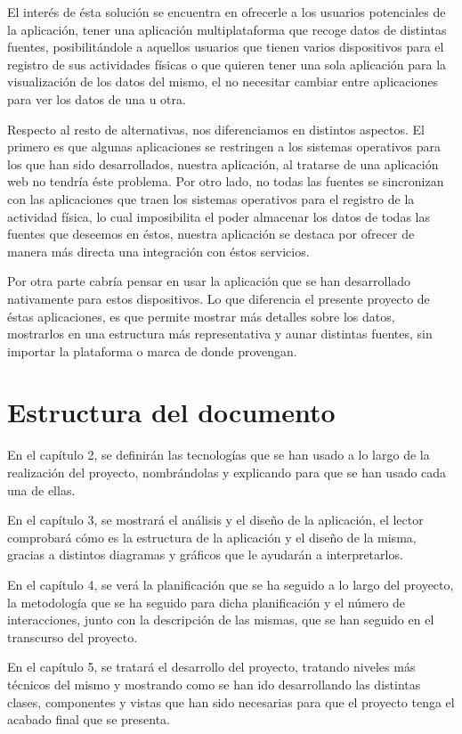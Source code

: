 \documentclass[11pt,openany]{book}
\begin{document}
El interés de ésta solución se encuentra en ofrecerle a los usuarios potenciales de la aplicación, tener una aplicación multiplataforma que recoge datos de distintas fuentes, posibilitándole a aquellos usuarios que tienen varios dispositivos para el registro de sus actividades físicas o que quieren tener una sola aplicación para la visualización de los datos del mismo, el no necesitar cambiar entre aplicaciones para ver los datos de una u otra.

Respecto al resto de alternativas, nos diferenciamos en distintos aspectos. El primero es que algunas aplicaciones se restringen a los sistemas operativos para los que han sido desarrollados, nuestra aplicación, al tratarse de una aplicación web no tendría éste problema. Por otro lado, no todas las fuentes se sincronizan con las aplicaciones que traen los sistemas operativos para el registro de la actividad física, lo cual imposibilita el poder almacenar los datos de todas las fuentes que deseemos en éstos, nuestra aplicación se destaca por ofrecer de manera más directa una integración con éstos servicios. 

Por otra parte cabría pensar en usar la aplicación que se han desarrollado nativamente para estos dispositivos. Lo que diferencia el presente proyecto de éstas aplicaciones, es que permite mostrar más detalles sobre los datos, mostrarlos en una estructura más representativa y aunar distintas fuentes, sin importar la plataforma o marca de donde provengan.

\section{Estructura del documento}

En el capítulo 2, se definirán las tecnologías que se han usado a lo largo de la realización del proyecto, nombrándolas y explicando para que se han usado cada una de ellas.

En el capítulo 3, se mostrará el análisis y el diseño de la aplicación, el lector comprobará cómo es la estructura de la aplicación y el diseño de la misma, gracias a distintos diagramas y gráficos que le ayudarán a interpretarlos.

En el capítulo 4, se verá la planificación que se ha seguido a lo largo del proyecto, la metodología que se ha seguido para dicha planificación y el número de interacciones, junto con la descripción de las mismas, que se han seguido en el transcurso del proyecto.

En el capítulo 5, se tratará el desarrollo del proyecto, tratando niveles más técnicos del mismo y mostrando como se han ido desarrollando las distintas clases, componentes y vistas que han sido necesarias para que el proyecto tenga el acabado final que se presenta.
\end{document}
